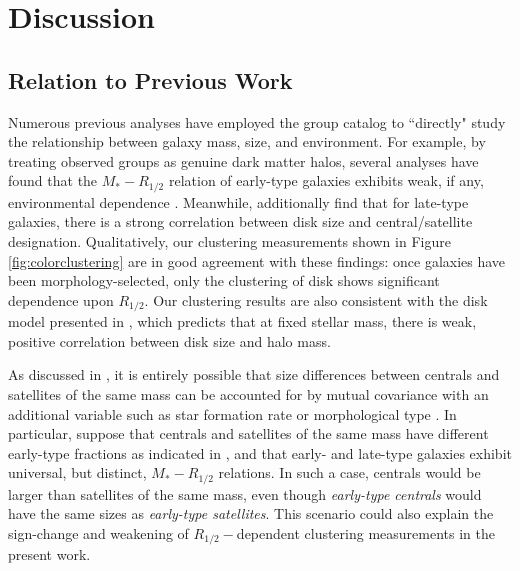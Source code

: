 \documentclass[usenatbib,usegraphicx,letterpaper]{mn2e}
\newcommand{\rhalf}{R_{1/2}}
\newcommand{\mstar}{M_{\ast}}
\begin{document}
\section{Discussion}
\label{sec:discussion}

\subsection{Relation to Previous Work}
\label{subsec:previous_work}

Numerous previous analyses have employed the \citet{yang_etal05b} group catalog to ``directly" study the relationship between galaxy mass, size, and environment. For example, by treating observed groups as genuine dark matter halos, several analyses have found that the $\mstar-\rhalf$ relation of early-type galaxies exhibits weak, if any, environmental dependence \citep{weinmann_etal08,huertas_company_etal13b,shankar_etal14}. Meanwhile, \citet{weinmann_etal08} additionally find that for late-type galaxies, there is a strong correlation between disk size and central/satellite designation. Qualitatively, our clustering measurements shown in Figure \ref{fig:colorclustering} are in good agreement with these findings: once galaxies have been morphology-selected, only the clustering of disk shows significant dependence upon $\rhalf.$ Our clustering results are also consistent with the disk model presented in \citet{dutton_etal08,dutton_etal10}, which predicts that at fixed stellar mass, there is weak, positive correlation between disk size and halo mass.

As discussed in \citet{spindler_wake17}, it is entirely possible that size differences between centrals and satellites of the same mass can be accounted for by mutual covariance with an additional variable such as star formation rate or morphological type \citep[see also][for an explicit demonstration of this scenario]{lilly_carollo16}. In particular, suppose that centrals and satellites of the same mass have different early-type fractions as indicated in \citet{weinmann_etal06}, and that early- and late-type galaxies exhibit universal, but distinct, $\mstar-\rhalf$ relations. In such a case, centrals would be larger than satellites of the same mass, even though {\em early-type centrals} would have the same sizes as {\em early-type satellites}. This scenario could also explain the sign-change and weakening of $\rhalf-$dependent clustering measurements in the present work. 
\end{document}
